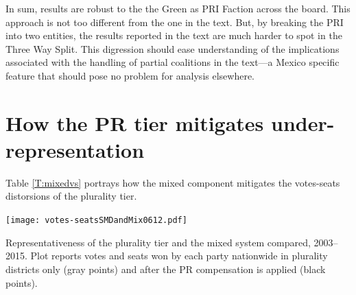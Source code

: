 \documentclass[letter,12pt]{article}
\begin{document}
In sum, results are robust to the the Green as PRI Faction across the board. This approach is not too different from the one in the text. But, by breaking the PRI into two entities, the results reported in the text are much harder to spot in the Three Way Split. This digression should ease understanding of the implications associated with the handling of partial coalitions in the text---a Mexico specific feature that should pose no problem for analysis elsewhere. 

\section{How the PR tier mitigates under-representation}

Table \ref{T:mixedvs} portrays how the mixed component mitigates the votes-seats distorsions of the plurality tier.

\begin{table}
\centering
\texttt{[image: votes-seatsSMDandMix0612.pdf]}
\caption{Representativeness of the plurality tier and the mixed system compared, 2003--2015. Plot reports votes and seats won by each party nationwide in plurality districts only (gray points) and after the PR compensation is applied (black points).}\label{T:mixedvs}
\end{table}






%

\end{document}

